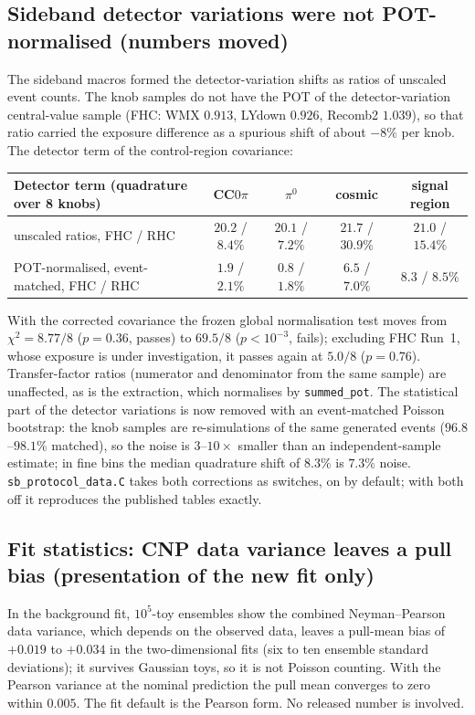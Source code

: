 \subsection{Sideband detector variations were not POT-normalised (numbers moved)}
The sideband macros formed the detector-variation shifts as ratios of unscaled event counts. The
knob samples do not have the POT of the detector-variation central-value sample (FHC: WMX $0.913$,
LYdown $0.926$, Recomb2 $1.039$), so that ratio carried the exposure difference as a spurious shift
of about $-8\%$ per knob. The detector term of the control-region covariance:

\begin{center}\small
\begin{tabular}{p{}cccc}
\toprule
Detector term (quadrature over 8 knobs) & CC$0\pi$ & $\pi^0$ & cosmic & signal region \\
\midrule
unscaled ratios, FHC / RHC & $20.2$ / $8.4\%$ & $20.1$ / $7.2\%$ & $21.7$ / $30.9\%$ & $21.0$ / $15.4\%$ \\
POT-normalised, event-matched, FHC / RHC & $1.9$ / $2.1\%$ & $0.8$ / $1.8\%$ & $6.5$ / $7.0\%$ & $8.3$ / $8.5\%$ \\
\bottomrule
\end{tabular}
\end{center}

\noindent With the corrected covariance the frozen global normalisation test moves from
$\chi^2 = 8.77/8$ ($p=0.36$, passes) to $69.5/8$ ($p<10^{-3}$, fails); excluding FHC Run~1, whose
exposure is under investigation, it passes again at $5.0/8$ ($p=0.76$). Transfer-factor ratios
(numerator and denominator from the same sample) are unaffected, as is the extraction, which
normalises by \texttt{summed\_pot}. The statistical part of the detector variations is now removed
with an event-matched Poisson bootstrap: the knob samples are re-simulations of the same generated
events ($96.8$--$98.1\%$ matched), so the noise is $3$--$10\times$ smaller than an
independent-sample estimate; in fine bins the median quadrature shift of $8.3\%$ is $7.3\%$ noise.
\texttt{sb\_protocol\_data.C} takes both corrections as switches, on by default; with both off it
reproduces the published tables exactly.

\subsection{Fit statistics: CNP data variance leaves a pull bias (presentation of the new fit only)}
In the background fit, $10^5$-toy ensembles show the combined Neyman--Pearson data variance, which
depends on the observed data, leaves a pull-mean bias of $+0.019$ to $+0.034$ in the
two-dimensional fits (six to ten ensemble standard deviations); it survives Gaussian toys, so it is
not Poisson counting. With the Pearson variance at the nominal prediction the pull mean converges to
zero within $0.005$. The fit default is the Pearson form. No released number is involved.

